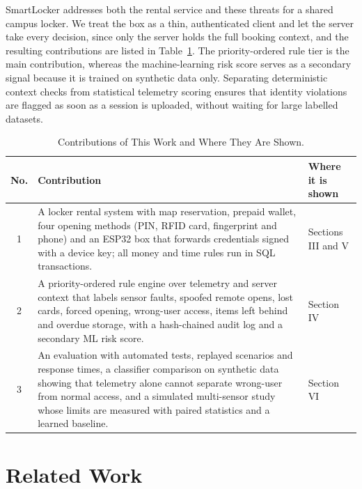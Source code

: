 \documentclass[journal,onecolumn]{IEEEtran}
\begin{document}
SmartLocker addresses both the rental service and these threats for a shared campus locker. We treat the box as a thin,
authenticated client and let the server take every decision, since only the server holds the full booking context, and
the resulting contributions are listed in Table~\ref{tab:contrib}. The priority-ordered rule tier is the main
contribution, whereas the machine-learning risk score serves as a secondary signal because it is trained on synthetic
data only. Separating deterministic context checks from statistical telemetry scoring ensures that identity violations
are flagged as soon as a session is uploaded, without waiting for large labelled datasets.

\begin{table}[!htbp]
\renewcommand{\arraystretch}{1.02}
\centering
\small
\caption{Contributions of This Work and Where They Are Shown.}
\label{tab:contrib}
\vspace{5pt}
\begin{tabular}{c p{11.9cm} p{2.7cm}}
\hline
No. & Contribution & Where it is shown \\
\hline
\rule{0pt}{2.6ex}1 & A locker rental system with map reservation, prepaid wallet, four opening methods (PIN, RFID card, fingerprint and
    phone) and an ESP32 box that forwards credentials signed with a device key; all money and time rules run in SQL transactions. & Sections III and V \\
2 & A priority-ordered rule engine over telemetry and server context that labels sensor faults, spoofed remote opens,
    lost cards, forced opening, wrong-user access, items left behind and overdue storage, with a hash-chained audit log and a secondary ML risk score. & Section IV \\
3 & An evaluation with automated tests, replayed scenarios and response times, a classifier comparison on synthetic
    data showing that telemetry alone cannot separate wrong-user from normal access, and a simulated multi-sensor
    study whose limits are measured with paired statistics and a learned baseline. & Section VI \\
\hline
\end{tabular}
\end{table}

\section{Related Work}
\end{document}
